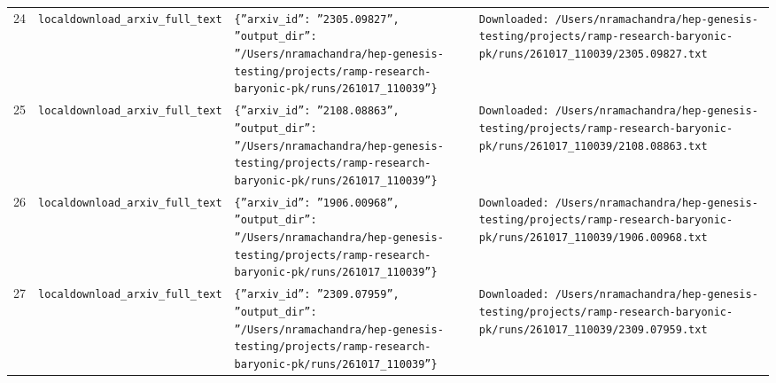 \documentclass[11pt,a4paper]{article}
\begin{document}
\begin{longtable}{@{}p{}p{}p{}p{}@{}}
24 & \texttt{local}\newline\texttt{download\_\allowbreak{}arxiv\_\allowbreak{}full\_\allowbreak{}text} & \texttt{\{''arxiv\_\allowbreak{}id'':\allowbreak{} ''2305.09827'',\allowbreak{} ''output\_\allowbreak{}dir'':\allowbreak{} ''/\allowbreak{}Users/\allowbreak{}nramachandra/\allowbreak{}hep-genesis-testing/\allowbreak{}projects/\allowbreak{}ramp-research-baryonic-pk/\allowbreak{}runs/\allowbreak{}261017\_\allowbreak{}110039''\}\allowbreak{}} & \texttt{Downloaded:\allowbreak{} /\allowbreak{}Users/\allowbreak{}nramachandra/\allowbreak{}hep-genesis-testing/\allowbreak{}projects/\allowbreak{}ramp-research-baryonic-pk/\allowbreak{}runs/\allowbreak{}261017\_\allowbreak{}110039/\allowbreak{}2305.09827.txt} \\
25 & \texttt{local}\newline\texttt{download\_\allowbreak{}arxiv\_\allowbreak{}full\_\allowbreak{}text} & \texttt{\{''arxiv\_\allowbreak{}id'':\allowbreak{} ''2108.08863'',\allowbreak{} ''output\_\allowbreak{}dir'':\allowbreak{} ''/\allowbreak{}Users/\allowbreak{}nramachandra/\allowbreak{}hep-genesis-testing/\allowbreak{}projects/\allowbreak{}ramp-research-baryonic-pk/\allowbreak{}runs/\allowbreak{}261017\_\allowbreak{}110039''\}\allowbreak{}} & \texttt{Downloaded:\allowbreak{} /\allowbreak{}Users/\allowbreak{}nramachandra/\allowbreak{}hep-genesis-testing/\allowbreak{}projects/\allowbreak{}ramp-research-baryonic-pk/\allowbreak{}runs/\allowbreak{}261017\_\allowbreak{}110039/\allowbreak{}2108.08863.txt} \\
26 & \texttt{local}\newline\texttt{download\_\allowbreak{}arxiv\_\allowbreak{}full\_\allowbreak{}text} & \texttt{\{''arxiv\_\allowbreak{}id'':\allowbreak{} ''1906.00968'',\allowbreak{} ''output\_\allowbreak{}dir'':\allowbreak{} ''/\allowbreak{}Users/\allowbreak{}nramachandra/\allowbreak{}hep-genesis-testing/\allowbreak{}projects/\allowbreak{}ramp-research-baryonic-pk/\allowbreak{}runs/\allowbreak{}261017\_\allowbreak{}110039''\}\allowbreak{}} & \texttt{Downloaded:\allowbreak{} /\allowbreak{}Users/\allowbreak{}nramachandra/\allowbreak{}hep-genesis-testing/\allowbreak{}projects/\allowbreak{}ramp-research-baryonic-pk/\allowbreak{}runs/\allowbreak{}261017\_\allowbreak{}110039/\allowbreak{}1906.00968.txt} \\
27 & \texttt{local}\newline\texttt{download\_\allowbreak{}arxiv\_\allowbreak{}full\_\allowbreak{}text} & \texttt{\{''arxiv\_\allowbreak{}id'':\allowbreak{} ''2309.07959'',\allowbreak{} ''output\_\allowbreak{}dir'':\allowbreak{} ''/\allowbreak{}Users/\allowbreak{}nramachandra/\allowbreak{}hep-genesis-testing/\allowbreak{}projects/\allowbreak{}ramp-research-baryonic-pk/\allowbreak{}runs/\allowbreak{}261017\_\allowbreak{}110039''\}\allowbreak{}} & \texttt{Downloaded:\allowbreak{} /\allowbreak{}Users/\allowbreak{}nramachandra/\allowbreak{}hep-genesis-testing/\allowbreak{}projects/\allowbreak{}ramp-research-baryonic-pk/\allowbreak{}runs/\allowbreak{}261017\_\allowbreak{}110039/\allowbreak{}2309.07959.txt} \\

\end{longtable}
\end{document}
